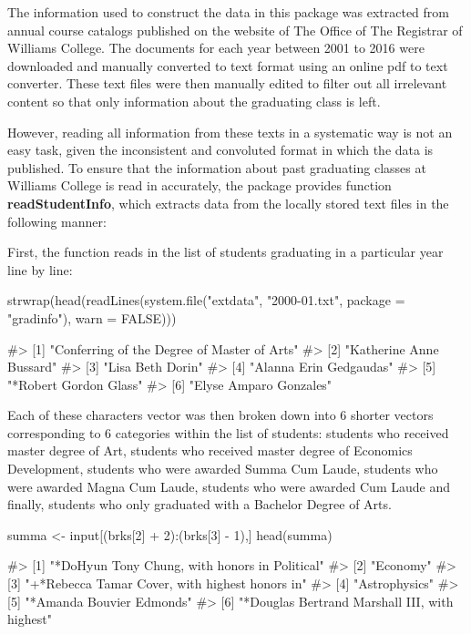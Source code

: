 The information used to construct the data in this package was extracted
from annual course catalogs published on the website of The Office of
The Registrar of Williams College. The documents for each year between
2001 to 2016 were downloaded and manually converted to text format using
an online pdf to text converter. These text files were then manually
edited to filter out all irrelevant content so that only information
about the graduating class is left.

However, reading all information from these texts in a systematic way is
not an easy task, given the inconsistent and convoluted format in which
the data is published. To ensure that the information about past
graduating classes at Williams College is read in accurately, the
package provides function \textbf{readStudentInfo}, which extracts data
from the locally stored text files in the following manner:

First, the function reads in the list of students graduating in a
particular year line by line:

\begin{Schunk}
\begin{Sinput}
strwrap(head(readLines(system.file("extdata", "2000-01.txt", package = "gradinfo"), warn = FALSE)))
\end{Sinput}
\begin{Soutput}
#> [1] "Conferring of the Degree of Master of Arts"
#> [2] "Katherine Anne Bussard"                    
#> [3] "Lisa Beth Dorin"                           
#> [4] "Alanna Erin Gedgaudas"                     
#> [5] "*Robert Gordon Glass"                      
#> [6] "Elyse Amparo Gonzales"
\end{Soutput}
\end{Schunk}

Each of these characters vector was then broken down into 6 shorter
vectors corresponding to 6 categories within the list of students:
students who received master degree of Art, students who received master
degree of Economics Development, students who were awarded Summa Cum
Laude, students who were awarded Magna Cum Laude, students who were
awarded Cum Laude and finally, students who only graduated with a
Bachelor Degree of Arts.

\begin{Schunk}
\begin{Sinput}
summa <- input[(brks[2] + 2):(brks[3] - 1),]
head(summa)
\end{Sinput}
\begin{Soutput}
#> [1] "*DoHyun Tony Chung, with honors in Political" 
#> [2] "Economy"                                      
#> [3] "+*Rebecca Tamar Cover, with highest honors in"
#> [4] "Astrophysics"                                 
#> [5] "*Amanda Bouvier Edmonds"                      
#> [6] "*Douglas Bertrand Marshall III, with highest"
\end{Soutput}
\end{Schunk}

